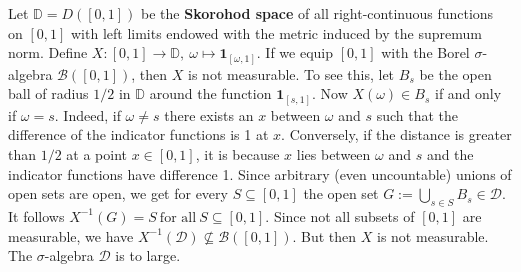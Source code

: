 \begin{example}
  \emph{\cite[Problem~1.7.3]{vaart2013}}
  Let $\mathbb{D}=D([0,1])$ be the \textbf{Skorohod space} of all right-continuous functions on $[0,1]$
  with left limits endowed with the metric induced by the supremum norm.
  Define 
  $
    X:
    [0,1]
    \to
    \mathbb{D}
    ,\ 
    \omega
    \mapsto
    \mathbf{1}_{[\omega,1]}
    .
  $
  If we equip $[0,1]$ with the Borel $\sigma$-algebra 
  $\mathcal{B}([0,1])$, then 
  $X$ is not measurable. To see this, let $B_s$ be the open ball of radius $1/2$ in $\mathbb{D}$ around the function $\mathbf{1}_{[s,1]}.$
  Now $X(\omega)\in B_s$
  if and only if $\omega=s.$ Indeed, if $\omega\neq s$ there exists an $x$ between $\omega$ and $s$ such that the difference of the indicator functions is 1 at $x$. Conversely, if the distance is greater than
  $1/2$ at a point $x\in [0,1]$, it is because $x$ lies between $\omega$ and $s$ and the indicator functions have difference 1.
  Since arbitrary (even uncountable) unions of open sets are open,
  we get for every $S\subseteq [0,1]$ the open set 
  $
  G
  :=
  \bigcup_{s\in S}
    B_s
    \in \mathcal{D}
    .
  $
  It follows
  $
  X^{-1}(G)=S 
  \ 
  \text{for all}
  \ 
  S \subseteq [0,1]
  .
  $
  Since not all subsets of $[0,1]$ are measurable, we have
  $
  X^{-1}(\mathcal{D})\nsubseteq \mathcal{B}([0,1])
.
$
But then $X$ is not measurable. The $\sigma$-algebra $\mathcal{D}$ is to large.
\end{example}
